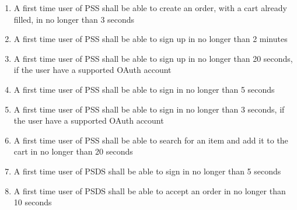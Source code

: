 \begin{enumerate}[label=USE-\arabic*]
    \item A first time user of PSS shall be able to create an order, with a 
    cart already filled, in no longer than 3 seconds
    \item A first time user of PSS shall be able to sign up in no longer 
    than 2 minutes
    \item A first time user of PSS shall be able to sign up in no longer 
    than 20 seconds, if the user have a supported OAuth account
    \item A first time user of PSS shall be able to sign in no longer 
    than 5 seconds
    \item A first time user of PSS shall be able to sign in no longer 
    than 3 seconds, if the user have a supported OAuth account
    \item A first time user of PSS shall be able to search for an item and 
    add it to the cart in no longer than 20 seconds
    \item A first time user of PSDS shall be able to sign in no longer 
    than 5 seconds
    \item A first time user of PSDS shall be able to accept an order in no 
    longer than 10 seconds
\end{enumerate}
\pagebreak
